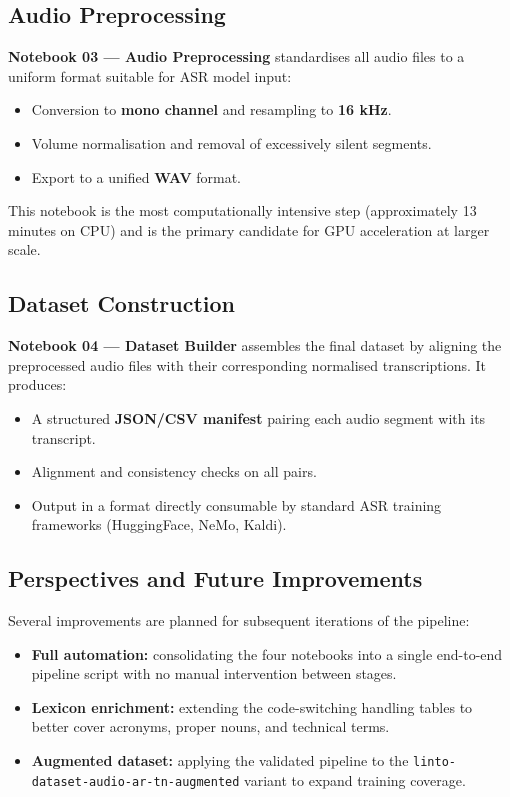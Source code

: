 \documentclass[12pt,a4paper]{report}
\begin{document}
\subsection{Audio Preprocessing}

\textbf{Notebook 03 — Audio Preprocessing} standardises all audio files to a uniform
format suitable for ASR model input:

\begin{itemize}
    \item Conversion to \textbf{mono channel} and resampling to \textbf{16 kHz}.
    \item Volume normalisation and removal of excessively silent segments.
    \item Export to a unified \textbf{WAV} format.
\end{itemize}

This notebook is the most computationally intensive step (approximately 13 minutes on CPU)
and is the primary candidate for GPU acceleration at larger scale.

\subsection{Dataset Construction}

\textbf{Notebook 04 — Dataset Builder} assembles the final dataset by aligning the
preprocessed audio files with their corresponding normalised transcriptions. It produces:

\begin{itemize}
    \item A structured \textbf{JSON/CSV manifest} pairing each audio segment with its
    transcript.
    \item Alignment and consistency checks on all pairs.
    \item Output in a format directly consumable by standard ASR training frameworks
    (HuggingFace, NeMo, Kaldi).
\end{itemize}

\subsection{Perspectives and Future Improvements}

Several improvements are planned for subsequent iterations of the pipeline:

\begin{itemize}
    \item \textbf{Full automation:} consolidating the four notebooks into a single end-to-end
    pipeline script with no manual intervention between stages.
    \item \textbf{Lexicon enrichment:} extending the code-switching handling tables to better
    cover acronyms, proper nouns, and technical terms.
    \item \textbf{Augmented dataset:} applying the validated pipeline to the
    \texttt{linto-dataset-audio-ar-tn-augmented} variant to expand training coverage.
\end{itemize}
\end{document}
